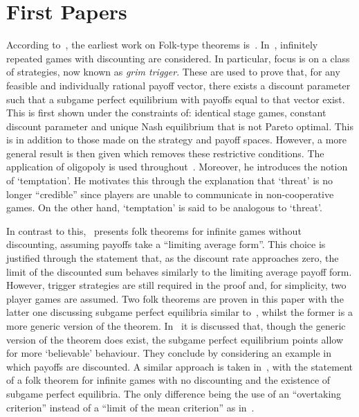 \section{First Papers}\label{sec:First_Papers}
According to~\cite{Abreu1994}, the earliest work on Folk-type theorems is~\cite{Friedman1971}. In~\cite{Friedman1971}, infinitely repeated games with
discounting are considered. In particular, focus is on a class of strategies,
now known as \emph{grim trigger}. These are used to prove that, for any feasible
and individually rational payoff vector, there exists a discount parameter such
that a subgame perfect equilibrium with payoffs equal to that vector exist. This
is first shown under the constraints of: identical stage games, constant
discount parameter and unique Nash equilibrium that is not Pareto optimal. This
is in addition to those made on the strategy and payoff spaces. However, a more
general result is then given which removes these restrictive conditions.
The application of oligopoly is used throughout~\cite{Friedman1971}. Moreover,
he introduces the notion of `temptation'. He motivates this through the
explanation that `threat' is no longer ``credible'' since players are unable to
communicate in non-cooperative games. On the other hand, `temptation' is said to be analogous to `threat'.

In contrast to this,~\cite{aumann1976long} presents folk theorems for infinite
games without discounting, assuming payoffs take a ``limiting average form''.
This choice is justified through the statement that, as the discount rate
approaches zero, the limit of the discounted sum behaves similarly to the
limiting average payoff
form. However, trigger strategies are still required in the proof and, for
simplicity, two player games are assumed. Two folk theorems are
proven in this paper with the latter one discussing subgame perfect equilibria
similar to~\cite{Friedman1971}, whilst the former is a more generic version of
the theorem. In~\cite{aumann1976long} it is discussed that, though the generic version of
the theorem does exist, the subgame perfect equilibrium points allow for more
`believable' behaviour. They conclude by considering an example in which payoffs
are discounted. A similar approach is taken in~\cite{Rubinstein1979}, with the
statement of a folk theorem for infinite games with no discounting and the
existence of subgame perfect equilibria. The only difference being the use of an
``overtaking criterion'' instead of a ``limit of the mean
criterion'' as in~\cite{aumann1976long}.


